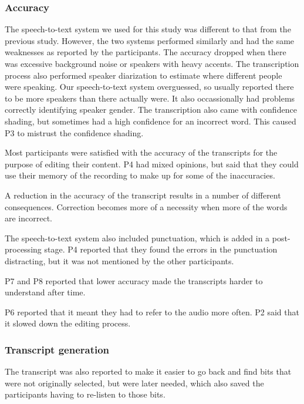 \subsubsection{Accuracy}


The speech-to-text system we used for this study was different to that from the previous study. However, the two
systems performed similarly and had the same weaknesses as reported by the participants. The accuracy dropped when
there was excessive background noise or speakers with heavy accents. The transcription process also performed speaker
diarization to estimate where different people were speaking. Our speech-to-text system overguessed, so usually
reported there to be more speakers than there actually were. It also occassionally had problems correctly identifying
speaker gender. The transcription also came with confidence shading, but sometimes had a high confidence for an
incorrect word. This caused P3 to mistrust the confidence shading.


Most participants were satisfied with the accuracy of the transcripts for the purpose of editing their content. P4 had
mixed opinions, but said that they could use their memory of the recording to make up for some of the inaccuracies.

A reduction in the accuracy of the transcript results in a number of different consequences. Correction becomes more of
a necessity when more of the words are incorrect.


The speech-to-text system also included punctuation, which is added in a post-processing stage. P4 reported that they
found the errors in the punctuation distracting, but it was not mentioned by the other participants.


P7 and P8 reported that lower accuracy made the transcripts harder to understand after time.

P6 reported that it meant they had to refer to the audio more often. P2 said that it slowed down the editing process.

\subsubsection{Transcript generation}


The transcript was also reported to make it easier to go back and find bits that were not originally selected, but were
later needed, which also saved the participants having to re-listen to those bits.


